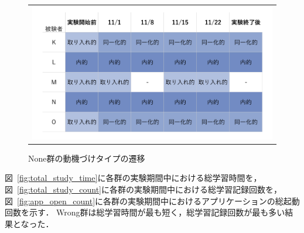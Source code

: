 \begin{figure}[htb]
\begin{center}
\begin{tabular}{c}
  \begin{minipage}[htb]{\linewidth}
  \begin{center}
  \includegraphics[width=12cm]{images/7/none_motivation_type.png}
  \caption{None群の動機づけタイプの遷移}
  \label{tb:none_motivation_type}
  \end{center}
  \end{minipage}

\end{tabular}
\end{center}
\end{figure}

図~\ref{fig:total_study_time}に各群の実験期間中における総学習時間を，図~\ref{fig:total_study_count}に各群の実験期間中における総学習記録回数を，図~\ref{fig:app_open_count}に各群の実験期間中におけるアプリケーションの総起動回数を示す．
Wrong群は総学習時間が最も短く，総学習記録回数が最も多い結果となった．


